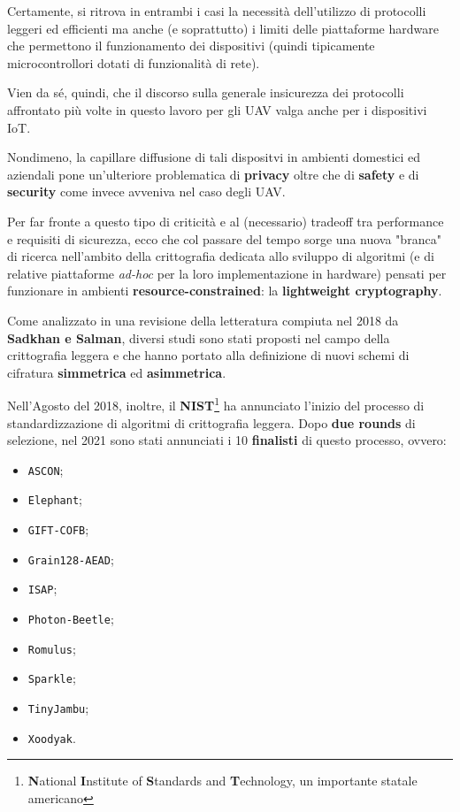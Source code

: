 \documentclass[a4paper, 12pt, oneside]{article}
\theoremstyle{definition}
\begin{document}
Certamente, si ritrova in entrambi i casi la necessità dell'utilizzo di protocolli leggeri ed efficienti ma anche (e soprattutto) i limiti delle piattaforme hardware che permettono il funzionamento dei dispositivi (quindi tipicamente microcontrollori dotati di funzionalità di rete). 

Vien da sé, quindi, che il discorso sulla generale insicurezza dei protocolli affrontato più volte in questo lavoro per gli UAV valga anche per i dispositivi IoT. 

Nondimeno, la capillare diffusione di tali dispositvi in ambienti domestici ed aziendali pone un'ulteriore problematica di \textbf{privacy} oltre che di \textbf{safety} e di \textbf{security} come invece avveniva nel caso degli UAV.

Per far fronte a questo tipo di criticità e al (necessario) tradeoff tra performance e requisiti di sicurezza, ecco che col passare del tempo sorge una nuova "branca" di ricerca nell'ambito della crittografia dedicata allo sviluppo di algoritmi (e di relative piattaforme \textit{ad-hoc} per la loro implementazione in hardware) pensati per funzionare in ambienti \textbf{resource-constrained}: la \textbf{lightweight cryptography}.

Come analizzato in una revisione della letteratura \cite{8370965} compiuta nel 2018 da \textbf{Sadkhan e Salman}, diversi studi sono stati proposti nel campo della crittografia leggera e che hanno portato alla definizione di nuovi schemi di cifratura \textbf{simmetrica} ed \textbf{asimmetrica}.

Nell'Agosto del 2018, inoltre, il \textbf{NIST}\footnote{\textbf{N}ational \textbf{I}nstitute of \textbf{S}tandards and \textbf{T}echnology, un importante statale americano} ha annunciato l'inizio del processo di standardizzazione \cite{nist-request-lwc} di algoritmi di crittografia leggera. Dopo \textbf{due rounds} di selezione, nel 2021 sono stati annunciati i 10 \textbf{finalisti} \cite{nist-finalists-lwc} di questo processo, ovvero:

\begin{itemize}
    \item \texttt{ASCON};
    \item \texttt{Elephant};
    \item \texttt{GIFT-COFB};
    \item \texttt{Grain128-AEAD};
    \item \texttt{ISAP};
    \item \texttt{Photon-Beetle};
    \item \texttt{Romulus};
    \item \texttt{Sparkle};
    \item \texttt{TinyJambu};
    \item \texttt{Xoodyak}.
\end{itemize}
\end{document}
